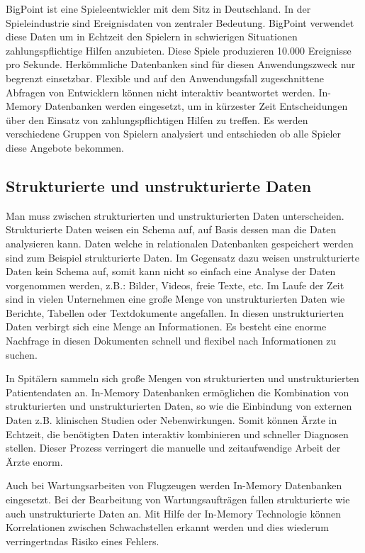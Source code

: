 \documentclass[draft,final]{vutinfth} %
\begin{document}
BigPoint ist eine Spieleentwickler mit dem Sitz in Deutschland. In der Spieleindustrie sind Ereignisdaten von zentraler Bedeutung. BigPoint verwendet diese Daten um in Echtzeit den Spielern in schwierigen Situationen zahlungspflichtige Hilfen anzubieten. Diese Spiele produzieren 10.000 Ereignisse pro Sekunde. Herkömmliche Datenbanken sind für diesen Anwendungszweck nur begrenzt einsetzbar. Flexible und auf den Anwendungsfall zugeschnittene Abfragen von Entwicklern können nicht interaktiv beantwortet werden. In-Memory Datenbanken werden eingesetzt, um in kürzester Zeit Entscheidungen über den Einsatz von zahlungspflichtigen Hilfen zu treffen. Es werden verschiedene Gruppen von Spielern analysiert und entschieden ob alle Spieler diese Angebote bekommen.

\subsection*{Strukturierte und unstrukturierte Daten}
Man muss zwischen strukturierten und unstrukturierten Daten unterscheiden. Strukturierte Daten weisen ein Schema auf, auf Basis dessen man die Daten analysieren kann. Daten welche in relationalen Datenbanken gespeichert werden sind zum Beispiel strukturierte Daten. Im Gegensatz dazu weisen unstrukturierte Daten kein Schema auf, somit kann nicht so einfach eine Analyse der Daten vorgenommen werden, z.B.: Bilder, Videos, freie Texte, etc. Im Laufe der Zeit sind in vielen Unternehmen eine gro\ss e Menge von unstrukturierten Daten wie Berichte, Tabellen oder Textdokumente angefallen. In diesen unstrukturierten Daten verbirgt sich eine Menge an Informationen. Es besteht eine enorme Nachfrage in diesen Dokumenten schnell und flexibel nach Informationen zu suchen.

In Spitälern sammeln sich gro\ss e Mengen von strukturierten und unstrukturierten Patientendaten an. In-Memory Datenbanken ermöglichen die Kombination von strukturierten und unstrukturierten Daten, so wie die Einbindung von externen Daten z.B. klinischen Studien oder Nebenwirkungen. Somit können Ärzte in Echtzeit, die benötigten Daten interaktiv kombinieren und schneller Diagnosen stellen. Dieser Prozess verringert die manuelle und zeitaufwendige Arbeit der Ärzte enorm.

Auch bei Wartungsarbeiten von Flugzeugen werden In-Memory Datenbanken eingesetzt. Bei der Bearbeitung von Wartungsaufträgen fallen strukturierte wie auch unstrukturierte Daten an. Mit Hilfe der In-Memory Technologie können Korrelationen zwischen Schwachstellen erkannt werden und dies wiederum verringertndas Risiko eines Fehlers.
\end{document}
